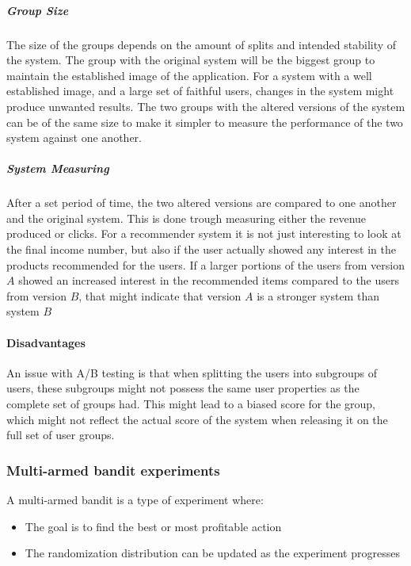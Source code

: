 \subparagraph{Group Size} %
  \label{par:group_size}
	The size of the groups depends on the amount of splits and intended stability of the system.
	The group with the original system will be the biggest group to maintain the established image of the application.
	For a system with a well established image, and a large set of faithful users, changes in the system might produce unwanted results.
	The two groups with the altered versions of the system can be of the same size to make it simpler to measure the performance of the two system against one another.

\subparagraph{System Measuring} %
\label{par:system_measuring}
	After a set period of time, the two altered versions are compared to one another and the original system.
	This is done trough measuring either the revenue produced or clicks.
	For a recommender system it is not just interesting to look at the final income number, but also if the user actually showed any interest in the products recommended for the users.
	If a larger portions of the users from version $A$ showed an increased interest in the recommended items compared to the users from version $B$, that might indicate that version $A$ is a stronger system than system $B$

\paragraph{Disadvantages}
	An issue with A/B testing is that when splitting the users into subgroups of users, these subgroups might not possess the same user properties as the complete set of groups had.
	This might lead to a biased score for the group, which might not reflect the actual score of the system when releasing it on the full set of user groups.


\subsubsection{Multi-armed bandit experiments \cite{googlebandit}}

	A multi-armed bandit is a type of experiment where:

	\begin{itemize}
	\item The goal is to find the best or most profitable action
	\item The randomization distribution can be updated as the experiment progresses
	\end{itemize}

